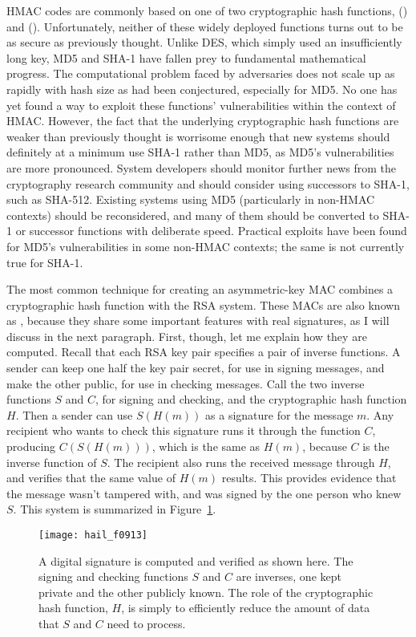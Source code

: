 HMAC codes are commonly based on one of two cryptographic hash
functions,  () and 
().  Unfortunately, neither of these
widely deployed functions turns out to be as secure as previously
thought.  Unlike DES, which simply used an insufficiently long key,
MD5 and SHA-1 have fallen prey to fundamental mathematical progress.  The
computational problem faced by adversaries does not scale up as
rapidly with hash size as had been conjectured, especially for MD5.  No one has yet found
a way to exploit these functions' vulnerabilities within the context
of HMAC.
However, the fact that the underlying cryptographic hash functions are weaker than previously thought is
worrisome enough that new systems should definitely at a minimum use SHA-1 rather
than MD5, as MD5's vulnerabilities are more pronounced.  System developers should monitor further news from the
cryptography research community and should consider using successors
to SHA-1, such as SHA-512.  Existing systems using MD5 (particularly in non-HMAC
contexts) should be reconsidered, and many of them should be converted
to SHA-1 or successor functions with deliberate speed.  Practical
exploits have been found for MD5's vulnerabilities in some
non-HMAC contexts; the same is not currently true for SHA-1.

The most common technique for creating an asymmetric-key MAC combines
a cryptographic hash function with the RSA system.  These MACs are
also known as , because they share some
important features with real signatures, as I will discuss in the next
paragraph.  First, though, let me explain how they are computed.
Recall that each RSA key pair specifies a pair of inverse functions.
A sender can keep one half the key pair secret, for use in signing
messages, and make the other public, for use in checking messages.
Call the two inverse functions $S$ and $C$, for signing and checking,
and the cryptographic hash function $H$.  Then a sender can use
$S(H(m))$ as a signature for the message $m$. Any recipient who wants to
check this signature runs it through the function $C$, producing
$C(S(H(m)))$, which is the same as $H(m)$, because $C$ is the inverse
function of $S$.  The recipient also runs the received message through
$H$, and verifies that the same value of $H(m)$ results.  This
provides evidence that the message wasn't tampered with, and was
signed by the one person who knew $S$.  This system is summarized in
Figure~\ref{scan-9-11}.
\begin{figure}
\centerline{\texttt{[image: hail\_f0913]}}
\caption{A digital signature is computed and verified as shown here.  The signing and
checking functions $S$ and $C$ are inverses, one kept private and the
other publicly known.  The role of the cryptographic hash function,
$H$, is simply to efficiently reduce the amount of data that $S$ and
$C$ need to process.}
\label{scan-9-11}
\end{figure}

